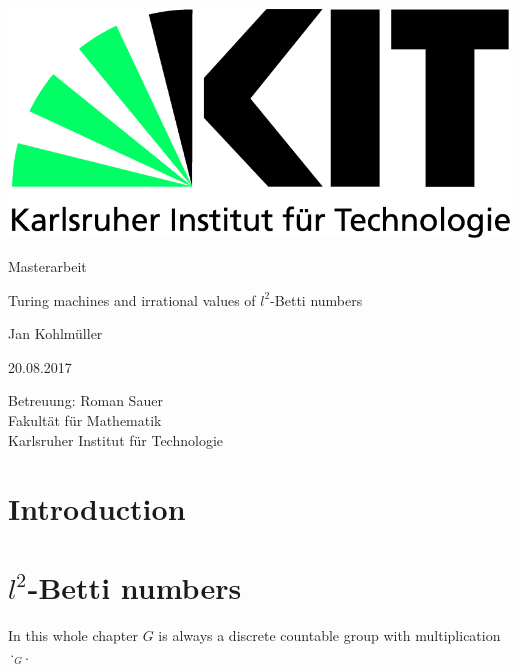 \documentclass[12pt,a4paper]{scrartcl}
\numberwithin{equation}{section}
\newcommand{\2}{\mathbb{Z} / 2 \mathbb{Z}}
\newcommand{\1}{\bar{1}}
\newcommand{\0}{\bar{0}}
\begin{document}
  \pagestyle{empty}

  \begin{titlepage}

    \includegraphics[scale=0.45]{kit-logo.jpg} 
    \vspace*{2cm} 

 \begin{center} \large 
    
    Masterarbeit
    \vspace*{2cm}

    {\huge Turing machines and irrational values of $l^2$-Betti numbers}
    \vspace*{2.5cm}

    Jan Kohlmüller
    \vspace*{1.5cm}

    20.08.2017
    \vspace*{4cm}


    Betreuung: Roman Sauer \\[1cm]
    Fakultät für Mathematik \\[1cm]
		Karlsruher Institut für Technologie
  \end{center}
\end{titlepage}



  \tableofcontents

\newpage
 


  \pagestyle{headings}

\section{Introduction}


\section{$l^2$-Betti numbers}
In this whole chapter $G$ is always a discrete countable group with multiplication $\cdot_G$.
\end{document}
